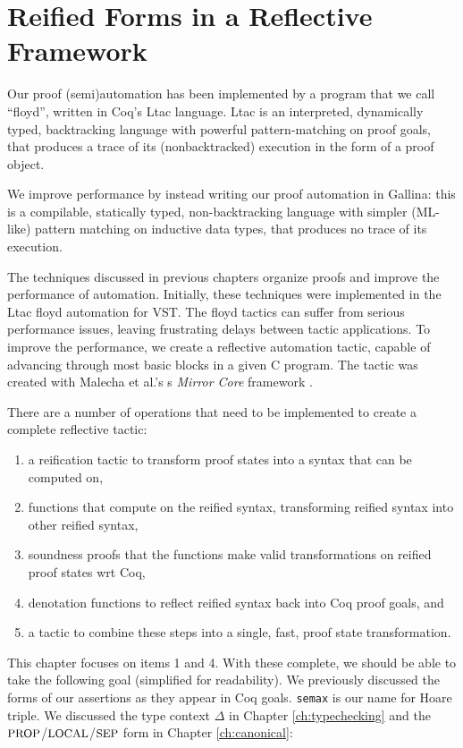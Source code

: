 \documentclass{puthesis}
\begin{document}
\chapter{Reified Forms in a Reflective Framework}
\label{ch:reflection}


Our proof (semi)automation has been implemented by a program that we
call ``floyd'', written in Coq's Ltac language.  Ltac is an interpreted,
dynamically typed, backtracking language with powerful
pattern-matching on proof goals, that produces a trace of its
(nonbacktracked) execution in the form of a proof object.

We improve performance by instead writing our proof automation in
Gallina: this is a compilable, statically typed, non-backtracking
language with simpler (ML-like) pattern matching on inductive data
types, that produces no trace of its execution.  

The techniques discussed in previous chapters organize proofs and
improve the performance of automation. Initially, these techniques
were implemented in the Ltac floyd automation for VST. The floyd
tactics can suffer from serious performance issues, leaving
frustrating delays between tactic applications. To improve the
performance, we create a reflective automation tactic, capable of
advancing through most basic blocks in a given C program.  The tactic
was created with Malecha et al.'s s \emph{Mirror Core} framework
\cite{malecha:thesis}.

There are a number of operations that need to be implemented to create
a complete reflective tactic: 
\begin{enumerate}
\item a reification tactic to transform proof states into a
  syntax that can be computed on,
\item functions that compute on the reified syntax, transforming
  reified syntax into other reified syntax,
\item soundness proofs that the functions make valid transformations
  on reified proof states wrt Coq,
\item denotation functions to reflect reified syntax back into Coq
  proof goals, and
\item a tactic to combine these steps into a single, fast, proof state
  transformation.
\end{enumerate}

This chapter focuses on items 1 and 4. With these complete, we should
be able to take the following goal (simplified for readability).  We
previously discussed the forms of our assertions as they appear in Coq
goals. \lstinline|semax| is our name for Hoare triple. We discussed
the type context $\Delta$ in Chapter \ref{ch:typechecking} and the
$\mbox{\small PROP}$/$\mbox{\small LOCAL}$/$\mbox{\small SEP}$ form in Chapter \ref{ch:canonical}:
\end{document}
